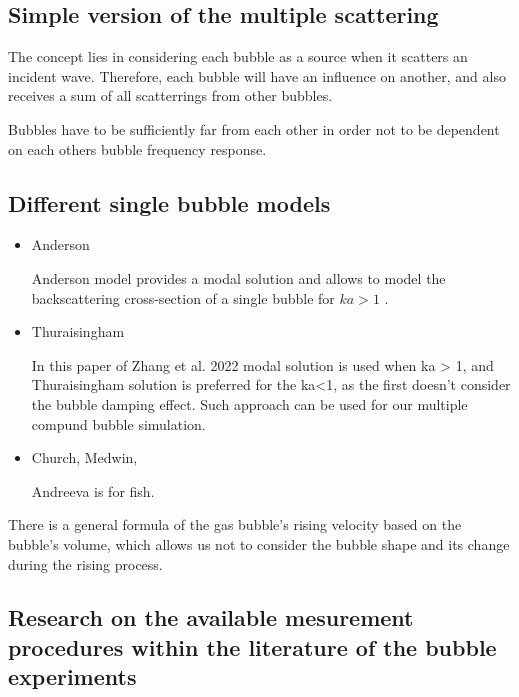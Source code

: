 \subsection{Simple version of the multiple scattering }

The concept lies in considering each bubble as a source when it scatters an incident wave. 
Therefore, each bubble will have an influence on another, and also receives a sum of all scatterrings from 
other bubbles. 

Bubbles have to be sufficiently far from each other in order not to be dependent on each others bubble frequency response.

\subsection{Different single bubble models}
\begin{itemize}
    \item Anderson

    Anderson model provides a modal solution and allows to model the backscattering cross-section of a single bubble for $ka > 1$ \cite{anderson_sound_2005}.

    \item Thuraisingham

    In this paper of Zhang et al. 2022 \cite{zhang_efficient_2022} modal solution is used when ka > 1, and Thuraisingham solution is preferred for the ka<1, as the first doesn't consider the bubble damping effect.  Such approach can be used for our multiple compund bubble simulation.

    \item Church, Medwin,

    Andreeva is for fish.


\end{itemize}


There is a general formula of the gas bubble's rising velocity based on the bubble's volume, which allows us not to consider the bubble shape and its change during the rising process.



\subsection{Research on the available mesurement procedures within the literature of the bubble experiments}

